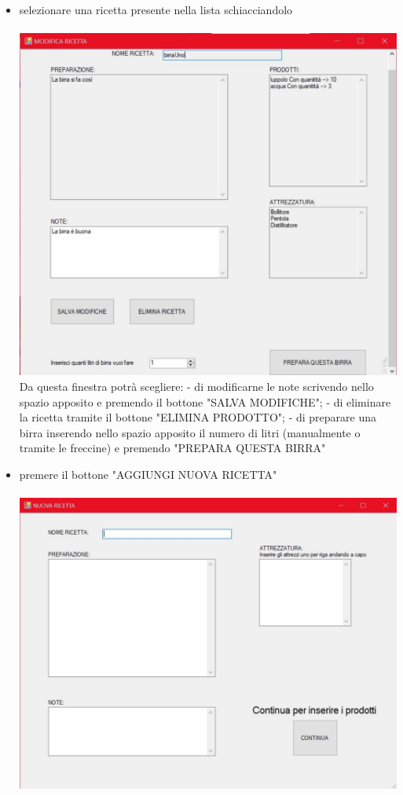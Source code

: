 \documentclass[a4paper, titlepage]{article}
\begin{document}
\begin{itemize}
    \item selezionare una ricetta presente nella lista schiacciandolo\\\\
    \includegraphics[scale=0.30]{Immagini/form/Form Ricetta.jpg}
    \\Da questa finestra potrà scegliere:
        \subitem - di modificarne le note scrivendo nello spazio apposito e premendo il bottone "SALVA MODIFICHE";
        \subitem - di eliminare la ricetta tramite il bottone "ELIMINA PRODOTTO";
        \subitem - di preparare una birra inserendo nello spazio apposito il numero di litri (manualmente o tramite le freccine) e premendo "PREPARA QUESTA BIRRA"
    \item premere il bottone "AGGIUNGI NUOVA RICETTA"\\\\
    \includegraphics[scale=0.30]{Immagini/form/Form AggiungiRic.jpg}

\end{itemize}
\end{document}
